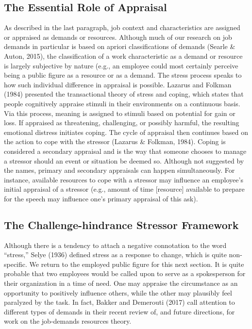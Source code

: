 \documentclass[
  english,
  man]{apa6}
\begin{document}
\hypertarget{the-essential-role-of-appraisal}{%
\subsection{The Essential Role of Appraisal}\label{the-essential-role-of-appraisal}}

As described in the last paragraph, job context and characteristics are assigned or appraised as demands or resources. Although much of our research on job demands in particular is based on apriori classifications of demands (Searle \& Auton, 2015), the classification of a work characteristic as a demand or resource is largely subjective by nature (e.g., an employee could most certainly perceive being a public figure as a resource or as a demand. The stress process speaks to how such individual difference in appraisal is possible. Lazarus and Folkman (1984) presented the transactional theory of stress and coping, which states that people cognitively appraise stimuli in their environments on a continuous basis. Via this process, meaning is assigned to stimuli based on potential for gain or loss. If appraised as threatening, challenging, or possibly harmful, the resulting emotional distress initiates coping. The cycle of appraisal then continues based on the action to cope with the stressor (Lazarus \& Folkman, 1984). Coping is considered a secondary appraisal and is the way that someone chooses to manage a stressor should an event or situation be deemed so. Although not suggested by the names, primary and secondary appraisals can happen simultaneously. For instance, available resources to cope with a stressor may influence an employee's initial appraisal of a stressor (e.g., amount of time {[}resource{]} available to prepare for the speech may influence one's primary appraisal of this ask).

\hypertarget{the-challenge-hindrance-stressor-framework}{%
\subsection{The Challenge-hindrance Stressor Framework}\label{the-challenge-hindrance-stressor-framework}}

Although there is a tendency to attach a negative connotation to the word ``stress,'' Selye (1936) defined stress as a response to change, which is quite non-specific. We return to the employed public figure for this next section. It is quite probable that two employees would be called upon to serve as a spokesperson for their organization in a time of need. One may appraise the circumstance as an opportunity to positively influence others, while the other may plausibly feel paralyzed by the task. In fact, Bakker and Demerouti (2017) call attention to different types of demands in their recent review of, and future directions, for work on the job-demands resources theory.
\end{document}
